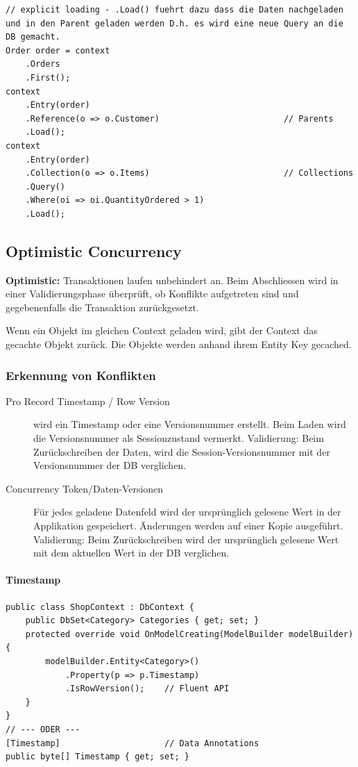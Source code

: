 \documentclass[
a4paper,
oneside,
10pt,
fleqn,
headsepline,
toc=listofnumbered, 
bibliography=totocnumbered]{scrartcl}
\begin{document}
\begin{lstlisting}
// explicit loading - .Load() fuehrt dazu dass die Daten nachgeladen und in den Parent geladen werden D.h. es wird eine neue Query an die DB gemacht.
Order order = context
    .Orders
    .First();
context
    .Entry(order)
    .Reference(o => o.Customer)                         // Parents
    .Load();
context
    .Entry(order)
    .Collection(o => o.Items)                           // Collections
    .Query()
    .Where(oi => oi.QuantityOrdered > 1)
    .Load();
\end{lstlisting}

\subsection{Optimistic Concurrency}

\textbf{Optimistic:} Transaktionen laufen unbehindert an. Beim Abschliessen wird in einer Validierungsphase überprüft, ob Konflikte aufgetreten sind und gegebenenfalls die Transaktion zurückgesetzt.

Wenn ein Objekt im gleichen Context geladen wird, gibt der Context das gecachte Objekt zurück.
Die Objekte werden anhand ihrem Entity Key gecached.

\subsubsection{Erkennung von Konflikten}
\begin{description}
	\item[Pro Record Timestamp / Row Version] wird ein Timestamp oder eine Versionsnummer erstellt. Beim Laden wird die Versionsnummer als Sessionzustand vermerkt. Validierung: Beim Zurückschreiben der Daten, wird die Session-Versionsnummer mit der Versionsnummer der DB verglichen.
	\item[Concurrency Token/Daten-Versionen] Für jedes geladene Datenfeld wird der ursprünglich gelesene Wert in der Applikation gespeichert. Änderungen werden auf einer Kopie ausgeführt. Validierung: Beim Zurückschreiben wird der ursprünglich gelesene Wert mit dem aktuellen Wert in der DB verglichen.
\end{description}

\paragraph{Timestamp}
\begin{lstlisting}
public class ShopContext : DbContext {
    public DbSet<Category> Categories { get; set; }
    protected override void OnModelCreating(ModelBuilder modelBuilder) {
        modelBuilder.Entity<Category>()
            .Property(p => p.Timestamp)
            .IsRowVersion();    // Fluent API
    }
}
// --- ODER ---
[Timestamp]                     // Data Annotations
public byte[] Timestamp { get; set; }
\end{lstlisting}
\end{document}
